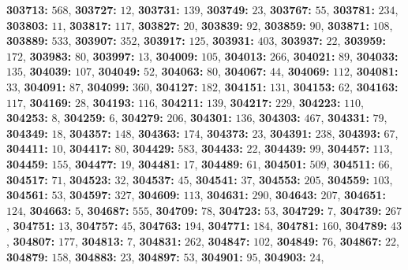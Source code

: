 \textsf{\bfseries 303713:} $568$, \textsf{\bfseries 303727:} $12$, \textsf{\bfseries 303731:} $139$, \textsf{\bfseries 303749:} $23$, \textsf{\bfseries 303767:} $55$, \textsf{\bfseries 303781:} $234$, \textsf{\bfseries 303803:} $11$, \textsf{\bfseries 303817:} $117$, \textsf{\bfseries 303827:} $20$, \textsf{\bfseries 303839:} $92$, \textsf{\bfseries 303859:} $90$, \textsf{\bfseries 303871:} $108$, \textsf{\bfseries 303889:} $533$, \textsf{\bfseries 303907:} $352$, \textsf{\bfseries 303917:} $125$, \textsf{\bfseries 303931:} $403$, \textsf{\bfseries 303937:} $22$, \textsf{\bfseries 303959:} $172$, \textsf{\bfseries 303983:} $80$, \textsf{\bfseries 303997:} $13$, \textsf{\bfseries 304009:} $105$, \textsf{\bfseries 304013:} $266$, \textsf{\bfseries 304021:} $89$, \textsf{\bfseries 304033:} $135$, \textsf{\bfseries 304039:} $107$, \textsf{\bfseries 304049:} $52$, \textsf{\bfseries 304063:} $80$, \textsf{\bfseries 304067:} $44$, \textsf{\bfseries 304069:} $112$, \textsf{\bfseries 304081:} $33$, \textsf{\bfseries 304091:} $87$, \textsf{\bfseries 304099:} $360$, \textsf{\bfseries 304127:} $182$, \textsf{\bfseries 304151:} $131$, \textsf{\bfseries 304153:} $62$, \textsf{\bfseries 304163:} $117$, \textsf{\bfseries 304169:} $28$, \textsf{\bfseries 304193:} $116$, \textsf{\bfseries 304211:} $139$, \textsf{\bfseries 304217:} $229$, \textsf{\bfseries 304223:} $110$, \textsf{\bfseries 304253:} $8$, \textsf{\bfseries 304259:} $6$, \textsf{\bfseries 304279:} $206$, \textsf{\bfseries 304301:} $136$, \textsf{\bfseries 304303:} $467$, \textsf{\bfseries 304331:} $79$, \textsf{\bfseries 304349:} $18$, \textsf{\bfseries 304357:} $148$, \textsf{\bfseries 304363:} $174$, \textsf{\bfseries 304373:} $23$, \textsf{\bfseries 304391:} $238$, \textsf{\bfseries 304393:} $67$, \textsf{\bfseries 304411:} $10$, \textsf{\bfseries 304417:} $80$, \textsf{\bfseries 304429:} $583$, \textsf{\bfseries 304433:} $22$, \textsf{\bfseries 304439:} $99$, \textsf{\bfseries 304457:} $113$, \textsf{\bfseries 304459:} $155$, \textsf{\bfseries 304477:} $19$, \textsf{\bfseries 304481:} $17$, \textsf{\bfseries 304489:} $61$, \textsf{\bfseries 304501:} $509$, \textsf{\bfseries 304511:} $66$, \textsf{\bfseries 304517:} $71$, \textsf{\bfseries 304523:} $32$, \textsf{\bfseries 304537:} $45$, \textsf{\bfseries 304541:} $37$, \textsf{\bfseries 304553:} $205$, \textsf{\bfseries 304559:} $103$, \textsf{\bfseries 304561:} $53$, \textsf{\bfseries 304597:} $327$, \textsf{\bfseries 304609:} $113$, \textsf{\bfseries 304631:} $290$, \textsf{\bfseries 304643:} $207$, \textsf{\bfseries 304651:} $124$, \textsf{\bfseries 304663:} $5$, \textsf{\bfseries 304687:} $555$, \textsf{\bfseries 304709:} $78$, \textsf{\bfseries 304723:} $53$, \textsf{\bfseries 304729:} $7$, \textsf{\bfseries 304739:} $267$, \textsf{\bfseries 304751:} $13$, \textsf{\bfseries 304757:} $45$, \textsf{\bfseries 304763:} $194$, \textsf{\bfseries 304771:} $184$, \textsf{\bfseries 304781:} $160$, \textsf{\bfseries 304789:} $43$, \textsf{\bfseries 304807:} $177$, \textsf{\bfseries 304813:} $7$, \textsf{\bfseries 304831:} $262$, \textsf{\bfseries 304847:} $102$, \textsf{\bfseries 304849:} $76$, \textsf{\bfseries 304867:} $22$, \textsf{\bfseries 304879:} $158$, \textsf{\bfseries 304883:} $23$, \textsf{\bfseries 304897:} $53$, \textsf{\bfseries 304901:} $95$, \textsf{\bfseries 304903:} $24$, 

